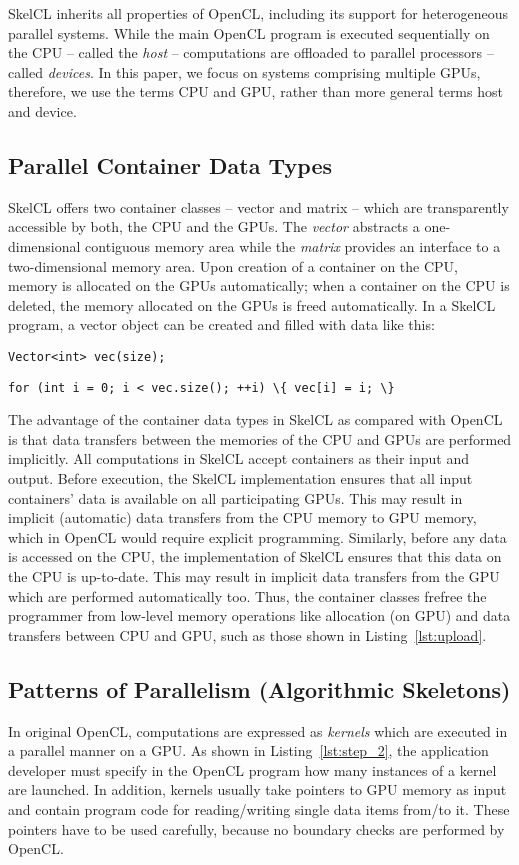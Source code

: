 SkelCL inherits all properties of OpenCL, including its support for heterogeneous parallel systems.
While the main OpenCL program is executed sequentially on the CPU -- called the \emph{host} -- computations are offloaded to parallel processors -- called \emph{devices}.
In this paper, we focus on systems comprising multiple GPUs, therefore, we use the terms CPU and GPU, rather than more general terms host and device.

\subsection{Parallel Container Data Types}
\label{sec:skelcl:abstract_vector}
SkelCL offers two container classes -- vector and matrix -- which are transparently accessible by both, the CPU and the GPUs.
The \emph{vector} abstracts a one-dimensional contiguous memory area while the \emph{matrix} provides an interface to a two-dimensional memory area.
Upon creation of a container on the CPU, memory is allocated on the GPUs automatically;
when a container on the CPU is deleted, the memory allocated on the GPUs is freed automatically.
In a SkelCL program, a vector object can be created and filled with data like this:

\vspace{.5em}
\centerline{\lstinline!Vector<int> vec(size);!}
\centerline{\lstinline!for (int i = 0; i < vec.size(); ++i) \{ vec[i] = i; \}!}
\vspace{.5em}

The advantage of the container data types in SkelCL as compared with OpenCL is that data transfers between the memories of the CPU and GPUs are performed implicitly.
All computations in SkelCL accept containers as their input and output.
Before execution, the SkelCL implementation ensures that all input containers' data is available on all participating GPUs.
This may result in implicit (automatic) data transfers from the CPU memory to GPU memory, which in OpenCL would require explicit programming.
Similarly, before any data is accessed on the CPU, the implementation of SkelCL ensures that this data on the CPU is up-to-date.
This may result in implicit data transfers from the GPU which are performed automatically too.
Thus, the container classes frefree the programmer from low-level memory operations like allocation (on GPU) and data transfers between CPU and GPU, such as those shown in Listing~\ref{lst:upload}.


\subsection{Patterns of Parallelism (Algorithmic Skeletons)}
\label{sec:skelcl:skeletons}
In original OpenCL, computations are expressed as \emph{kernels} which are executed in a parallel manner on a GPU.
As shown in Listing~\ref{lst:step_2}, the application developer must specify in the OpenCL program how many instances of a kernel are launched.
In addition, kernels usually take pointers to GPU memory as input and contain program code for reading/writing single data items from/to it.
These pointers have to be used carefully, because no boundary checks are performed by OpenCL.

